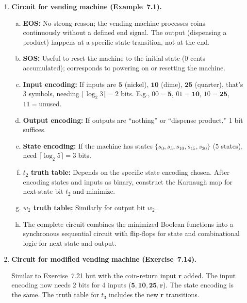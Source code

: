 \begin{enumerate}[{7.}1.]
\begin{enumerate}[(a)]
  \item \textbf{Moore machine diagram:} Three states with state-output labels; same transition structure.
\end{enumerate}

\item \textbf{Circuit for vending machine (Example~7.1).}

\begin{enumerate}[(a)]
  \item \textbf{EOS:} No strong reason; the vending machine processes coins continuously without a defined end signal.  The output (dispensing a product) happens at a specific state transition, not at the end.

  \item \textbf{SOS:} Useful to reset the machine to the initial state (0 cents accumulated); corresponds to powering on or resetting the machine.

  \item \textbf{Input encoding:} If inputs are $\pmb{5}$ (nickel), $\pmb{10}$ (dime), $\pmb{25}$ (quarter), that's 3 symbols, needing $\lceil\log_2 3\rceil=2$ bits.  E.g., $00=\pmb{5}$, $01=\pmb{10}$, $10=\pmb{25}$, $11=$unused.

  \item \textbf{Output encoding:} If outputs are ``nothing'' or ``dispense product,'' 1 bit suffices.

  \item \textbf{State encoding:} If the machine has states $\{s_0,s_5,s_{10},s_{15},s_{20}\}$ (5 states), need $\lceil\log_2 5\rceil=3$ bits.

  \item \textbf{$t_2$ truth table:} Depends on the specific state encoding chosen.  After encoding states and inputs as binary, construct the Karnaugh map for next-state bit $t_2$ and minimize.

  \item \textbf{$w_2$ truth table:} Similarly for output bit $w_2$.

  \item The complete circuit combines the minimized Boolean functions into a synchronous sequential circuit with flip-flops for state and combinational logic for next-state and output.
\end{enumerate}

\item \textbf{Circuit for modified vending machine (Exercise~7.14).}

Similar to Exercise~7.21 but with the coin-return input $\pmb{r}$ added.  The input encoding now needs 2 bits for 4 inputs ($\pmb{5},\pmb{10},\pmb{25},\pmb{r}$).  The state encoding is the same.  The truth table for $t_3$ includes the new $\pmb{r}$ transitions.


\end{enumerate}
